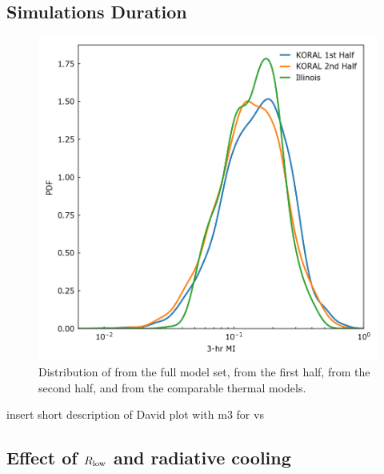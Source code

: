 


\subsection{Simulations Duration}\label{app:narayan}

\begin{figure}
  \centering
  \includegraphics[width=\columnwidth]{./figures/Koral_vs_IL_MI.png}
  \caption{Distribution of  from the full \koral model set, from the first half, from the second half, and from the comparable \kharma thermal models.}
  \label{fig:koral_MI}
\end{figure}  


insert short description of David plot with m3 for \koral vs \kharma


\subsection{Effect of $R_\mathrm{low}$ and radiative cooling}

